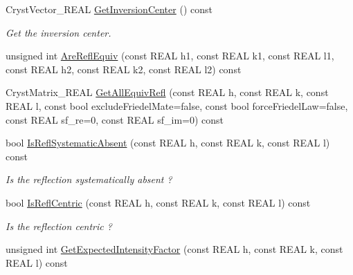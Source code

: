 \begin{DoxyCompactItemize}
\mbox{\label{class_obj_cryst_1_1_space_group_aa881ad08e7fed4b38fea7533b718fb88}} 
Cryst\+Vector\+\_\+\+R\+E\+AL \mbox{\hyperlink{class_obj_cryst_1_1_space_group_aa881ad08e7fed4b38fea7533b718fb88}{Get\+Inversion\+Center}} () const
\begin{DoxyCompactList}\small\item\em Get the inversion center. \end{DoxyCompactList}\item 
unsigned int \mbox{\hyperlink{class_obj_cryst_1_1_space_group_a97ca9db1202aa1ff1d61458f25c8acaa}{Are\+Refl\+Equiv}} (const R\+E\+AL h1, const R\+E\+AL k1, const R\+E\+AL l1, const R\+E\+AL h2, const R\+E\+AL k2, const R\+E\+AL l2) const
\item 
Cryst\+Matrix\+\_\+\+R\+E\+AL \mbox{\hyperlink{class_obj_cryst_1_1_space_group_aee36e98c4a5044b14429dd8f7d98c2f3}{Get\+All\+Equiv\+Refl}} (const R\+E\+AL h, const R\+E\+AL k, const R\+E\+AL l, const bool exclude\+Friedel\+Mate=false, const bool force\+Friedel\+Law=false, const R\+E\+AL sf\+\_\+re=0, const R\+E\+AL sf\+\_\+im=0) const
\item 
\mbox{\label{class_obj_cryst_1_1_space_group_a88474d366e626ba4b8850a7b942b01f9}} 
bool \mbox{\hyperlink{class_obj_cryst_1_1_space_group_a88474d366e626ba4b8850a7b942b01f9}{Is\+Refl\+Systematic\+Absent}} (const R\+E\+AL h, const R\+E\+AL k, const R\+E\+AL l) const
\begin{DoxyCompactList}\small\item\em Is the reflection systematically absent ? \end{DoxyCompactList}\item 
\mbox{\label{class_obj_cryst_1_1_space_group_a27e0472c409eb4a4e0813e28cfe68f4e}} 
bool \mbox{\hyperlink{class_obj_cryst_1_1_space_group_a27e0472c409eb4a4e0813e28cfe68f4e}{Is\+Refl\+Centric}} (const R\+E\+AL h, const R\+E\+AL k, const R\+E\+AL l) const
\begin{DoxyCompactList}\small\item\em Is the reflection centric ? \end{DoxyCompactList}\item 
unsigned int \mbox{\hyperlink{class_obj_cryst_1_1_space_group_a6f0b08e8a3e713b596bc424407859d7a}{Get\+Expected\+Intensity\+Factor}} (const R\+E\+AL h, const R\+E\+AL k, const R\+E\+AL l) const
\end{DoxyCompactItemize}


